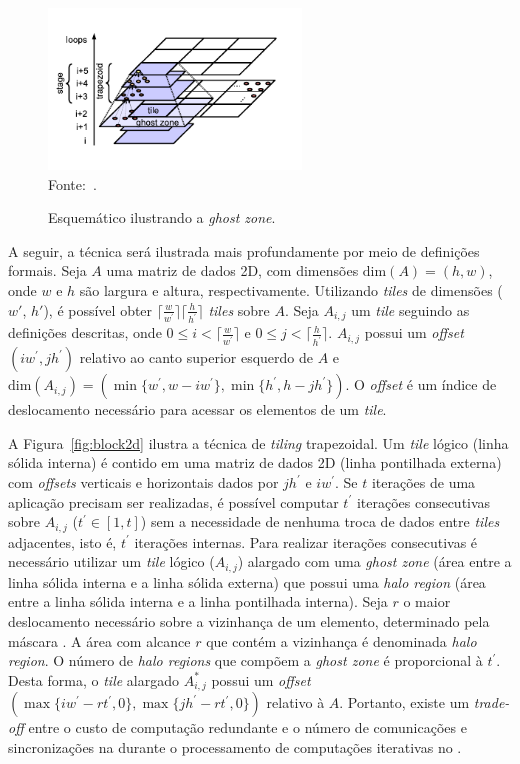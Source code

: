 \begin{figure}[!h]
	\centering
    \caption{Esquemático ilustrando a \textit{ghost zone}.}
    \includegraphics[width=0.6\textwidth]{figs/tiling.pdf} \\
    Fonte:~\cite{meng11}.
    \label{fig:tiling}
\end{figure}



A seguir, a técnica será ilustrada mais profundamente
por meio de definições formais. Seja $A$ uma matriz de dados 2D, com dimensões
$\textrm{dim}(A) = (h,w)$, onde $w$ e $h$ são largura e altura, respectivamente.
Utilizando \textit{tiles} de dimensões ($w'$, $h'$), é possível obter
$\lceil\frac{w}{w^\prime}\rceil\lceil\frac{h}{h^\prime}\rceil$ \textit{tiles}
sobre $A$. Seja $A_{i,j}$ um \textit{tile} seguindo as definições descritas,
onde $0 \leq i < \lceil\frac{w}{w^\prime}\rceil$ e $0\leq j <
\lceil\frac{h}{h^\prime}\rceil$. $A_{i,j}$ possui um \textit{offset} $(i
w^\prime, j h^\prime)$ relativo ao canto superior esquerdo de $A$ e
$\textrm{dim}(A_{i,j}) = (\min\{w^\prime, w-i w^\prime\}, \min\{h^\prime, h-j
h^\prime\})$. O \textit{offset} é um índice de deslocamento necessário para
acessar os elementos de um \textit{tile}.

A Figura~\ref{fig:block2d} ilustra a técnica de \textit{tiling} trapezoidal. Um
\textit{tile} lógico (linha sólida interna) é contido em uma matriz de dados 2D
(linha pontilhada externa) com \textit{offsets} verticais e horizontais dados
por $jh^\prime$ e $iw^\prime$. Se $t$ iterações de uma aplicação \stencil
precisam ser realizadas, é possível computar $t^\prime$ iterações consecutivas
sobre $A_{i,j}$ ($t^\prime \in \left[1,t\right]$) sem a necessidade de nenhuma
troca de dados entre \textit{tiles} adjacentes, isto é, $t^\prime$ iterações
internas. Para realizar iterações consecutivas é necessário utilizar um
\textit{tile} lógico ($A_{i,j}$) alargado com uma \textit{ghost zone} (área
entre a linha sólida interna e a linha sólida externa) que possui uma
\textit{halo region} (área entre a linha sólida interna e a linha pontilhada
interna). Seja $r$ o maior deslocamento necessário sobre a vizinhança de um
elemento, determinado pela máscara \stencil. A área com alcance $r$ que contém a
vizinhança é denominada \textit{halo region}. O número de \textit{halo regions}
que compõem a \textit{ghost zone} é proporcional à $t^\prime$. Desta forma, o
\textit{tile} alargado $A^\ast_{i,j}$ possui um \textit{offset} $(\max\{iw^\prime -
rt^\prime, 0\}, \max\{jh^\prime - rt^\prime, 0\})$ relativo à $A$. Portanto,
existe um \textit{trade-off} entre o custo de computação redundante e o número
de comunicações e sincronizações na \noc durante o processamento de computações
\stencil iterativas no \mppa.


